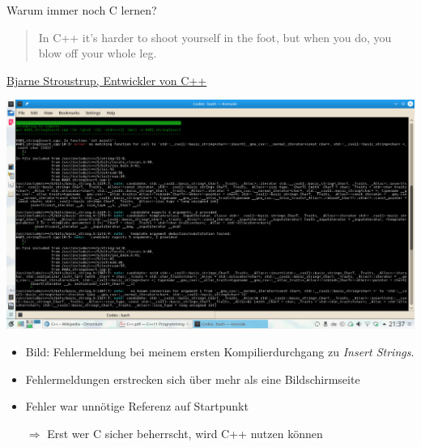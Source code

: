 \begin{frame}{Warum immer noch C lernen?}
%
%
\begin{tcolorbox}[title=Zitat, height=4cm]
%
\vspace{5pt}
\begin{quotation}
In C++ it’s harder to shoot yourself in the foot, but when you do, you blow off your whole leg.
\end{quotation}
\vspace{-11pt}
%
\begin{flushright}
\footnotesize \href{https://www.youtube.com/watch?v=9QKHg8wj4MA}{Bjarne Stroustrup, Entwickler von C++}
\end{flushright}
%
\end{tcolorbox}
%
\includegraphics[width=.495\linewidth]{./gfx/cppFirst}
%
\vspace{-12pt}
\begin{itemize}
\item Bild: Fehlermeldung bei meinem ersten Kompilierdurchgang zu \emph{Insert Strings}.
\item Fehlermeldungen erstrecken sich über mehr als eine Bildschirmseite
\item Fehler war unnötige Referenz auf Startpunkt
\item[$\Rightarrow$] Erst wer C sicher beherrscht, wird C++ nutzen können
\end{itemize}
%
\end{frame}


